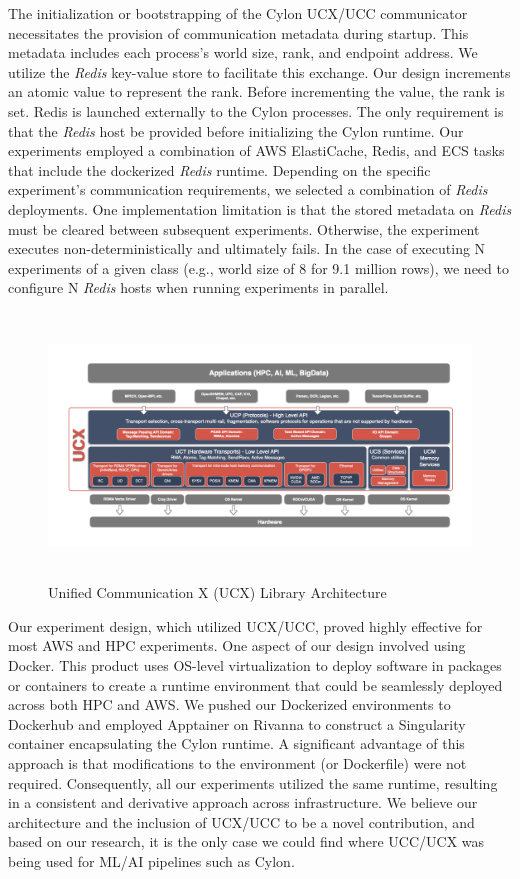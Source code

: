 The initialization or bootstrapping of the Cylon UCX/UCC communicator necessitates the provision of communication metadata during startup. This metadata includes each process's world size, rank, and endpoint address. We utilize the \textit{Redis} key-value store to facilitate this exchange. Our design increments an atomic value to represent the rank. Before incrementing the value, the rank is set. Redis is launched externally to the Cylon processes. The only requirement is that the \textit{Redis} host be provided before initializing the Cylon runtime. Our experiments employed a combination of AWS ElastiCache, Redis, and ECS tasks that include the dockerized \textit{Redis} runtime. Depending on the specific experiment’s communication requirements, we selected a combination of \textit{Redis} deployments. One implementation limitation is that the stored metadata on \textit{Redis} must be cleared between subsequent experiments. Otherwise, the experiment executes non-deterministically and ultimately fails. In the case of executing N experiments of a given class (e.g., world size of 8 for 9.1 million rows), we need to configure N \textit{Redis} hosts when running experiments in parallel.

\begin{figure}[ht]
    \begin{center}
    \includegraphics[width=\linewidth, height=200pt]{source/Figure/ucxarchitecture.png}
    \end{center}
    \caption{Unified Communication X (UCX) Library Architecture\cite{shamis2015ucx}}
    \label{fig:ucxarch}
\end{figure}

Our experiment design, which utilized UCX/UCC, proved highly effective for most AWS and HPC experiments. One aspect of our design involved using Docker. This product uses OS-level virtualization to deploy software in packages or containers to create a runtime environment that could be seamlessly deployed across both HPC and AWS\cite{dockerwiki}. We pushed our Dockerized environments to Dockerhub and employed Apptainer on Rivanna to construct a Singularity container encapsulating the Cylon runtime. A significant advantage of this approach is that modifications to the environment (or Dockerfile) were not required. Consequently, all our experiments utilized the same runtime, resulting in a consistent and derivative approach across infrastructure.  We believe our architecture and the inclusion of UCX/UCC to be a novel contribution, and based on our research, it is the only case we could find where UCC/UCX was being used for ML/AI pipelines such as Cylon.

